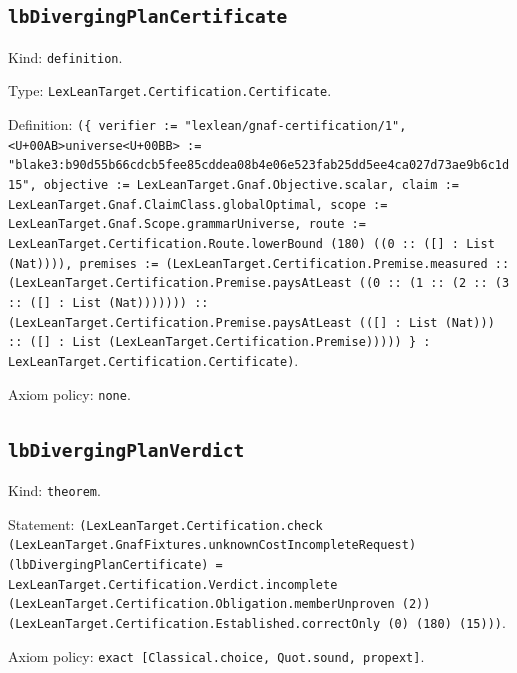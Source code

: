 \documentclass[11pt]{article}
\begin{document}
\subsection*{\texttt{lbDivergingPlanCertificate}}
\noindent Kind: \texttt{definition}.\par
\noindent Type: \texttt{LexLeanTarget.Certification.Certificate}.\par
\noindent Definition: \texttt{(\{ verifier := "lexlean/gnaf-certification/1", <U+00AB>universe<U+00BB> := "blake3:b90d55b66cdcb5fee85cddea08b4e06e523fab25dd5ee4ca027d73ae9b6c1d15", objective := LexLeanTarget.Gnaf.Objective.scalar, claim := LexLeanTarget.Gnaf.ClaimClass.globalOptimal, scope := LexLeanTarget.Gnaf.Scope.grammarUniverse, route := LexLeanTarget.Certification.Route.lowerBound (180) ((0 :: ([] : List (Nat)))), premises := (LexLeanTarget.Certification.Premise.measured :: (LexLeanTarget.Certification.Premise.paysAtLeast ((0 :: (1 :: (2 :: (3 :: ([] : List (Nat))))))) :: (LexLeanTarget.Certification.Premise.paysAtLeast (([] : List (Nat))) :: ([] : List (LexLeanTarget.Certification.Premise))))) \} : LexLeanTarget.Certification.Certificate)}.\par
\noindent Axiom policy: \texttt{none}.\par
\subsection*{\texttt{lbDivergingPlanVerdict}}
\noindent Kind: \texttt{theorem}.\par
\noindent Statement: \texttt{(LexLeanTarget.Certification.check (LexLeanTarget.GnafFixtures.unknownCostIncompleteRequest) (lbDivergingPlanCertificate) = LexLeanTarget.Certification.Verdict.incomplete (LexLeanTarget.Certification.Obligation.memberUnproven (2)) (LexLeanTarget.Certification.Established.correctOnly (0) (180) (15)))}.\par
\noindent Axiom policy: \texttt{exact [Classical.choice, Quot.sound, propext]}.\par
\end{document}
